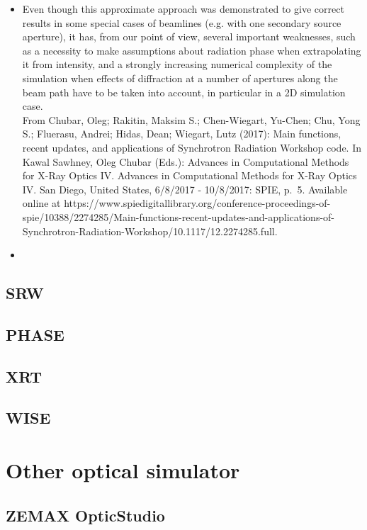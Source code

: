 \documentclass[../main.tex]{subfiles}
\begin{document}
	\begin{itemize}
	\item Even though this approximate approach was demonstrated to give correct results in some special cases of beamlines (e.g. with one secondary source aperture), it has, from our point of view, several important weaknesses, such as a necessity to make assumptions about radiation phase when extrapolating it from intensity, and a strongly increasing numerical complexity of the simulation when effects of diffraction at a number of apertures along the beam path have to be taken into account, in particular in a 2D simulation case.\\From Chubar, Oleg; Rakitin, Maksim S.; Chen-Wiegart, Yu-Chen; Chu, Yong S.; Fluerasu, Andrei; Hidas, Dean; Wiegart, Lutz (2017): Main functions, recent updates, and applications of Synchrotron Radiation Workshop code. In Kawal Sawhney, Oleg Chubar (Eds.): Advances in Computational Methods for X-Ray Optics IV. Advances in Computational Methods for X-Ray Optics IV. San Diego, United States, 6/8/2017 - 10/8/2017: SPIE, p. 5. Available online at https://www.spiedigitallibrary.org/conference-proceedings-of-spie/10388/2274285/Main-functions-recent-updates-and-applications-of-Synchrotron-Radiation-Workshop/10.1117/12.2274285.full.
	\item 
	\end{itemize}

	\subsection{SRW}

	\subsection{PHASE}

	\subsection{XRT}

	\subsection{WISE}

	\section{Other optical simulator}
	\subsection{ZEMAX OpticStudio}
\end{document}
